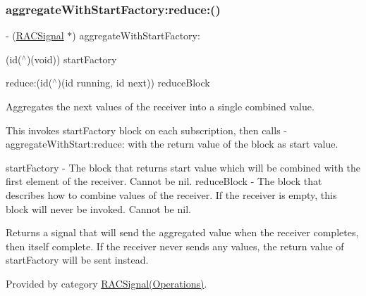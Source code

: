 \mbox{\label{interface_r_a_c_signal_a51c08c7a357f83c96c468a6aa13d4d87}} 
\subsubsection{\texorpdfstring{aggregate\+With\+Start\+Factory\+:reduce\+:()}{aggregateWithStartFactory:reduce:()}\hspace{0.1cm}{\footnotesize\ttfamily [1/3]}}
{\footnotesize\ttfamily -\/ (\mbox{\hyperlink{interface_r_a_c_signal}{R\+A\+C\+Signal}} $\ast$) aggregate\+With\+Start\+Factory\+: \begin{DoxyParamCaption}\item[{(id($^\wedge$)(void))}]{start\+Factory }\item[{reduce:(id($^\wedge$)(id running, id next))}]{reduce\+Block }\end{DoxyParamCaption}}

Aggregates the {\ttfamily next} values of the receiver into a single combined value.

This invokes {\ttfamily start\+Factory} block on each subscription, then calls -\/aggregate\+With\+Start\+:reduce\+: with the return value of the block as start value.

start\+Factory -\/ The block that returns start value which will be combined with the first element of the receiver. Cannot be nil. reduce\+Block -\/ The block that describes how to combine values of the receiver. If the receiver is empty, this block will never be invoked. Cannot be nil.

Returns a signal that will send the aggregated value when the receiver completes, then itself complete. If the receiver never sends any values, the return value of {\ttfamily start\+Factory} will be sent instead. 

Provided by category \mbox{\hyperlink{category_r_a_c_signal_07_operations_08_a51c08c7a357f83c96c468a6aa13d4d87}{R\+A\+C\+Signal(\+Operations)}}.

